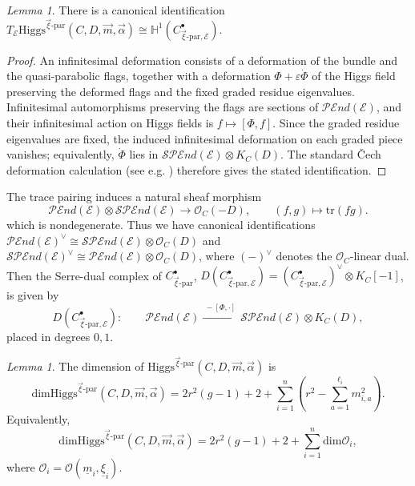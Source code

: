 \documentclass[11pt]{amsart}
\theoremstyle{plain}
\theoremstyle{definition}
\theoremstyle{remark}
\newtheorem{lemma}[theorem]{Lemma}
\newcommand{\End}{\mathcal E nd}
\newcommand{\HH}{\mathbb H}
\newcommand{\PEnd}{\mathcal P\!\End}
\newcommand{\SPEnd}{\mathcal{SP}\!\End}
\newcommand{\cO}{\mathcal O}
\newcommand{\Higgs}{\mathrm{Higgs}}
\def\dim{\mathrm{dim}}
\def\uxi{{\underline{\xi}}}
\def\vxi{\vec{\xi}}
\def\um{{\underline{m}}}
\begin{document}
\begin{lemma}\label{lem:tangent-hypercoh}
	There is a canonical identification
	$T_{\mathcal E}\Higgs^{\vec\xi\text{-par}}(C,D,\vec m,\vec\alpha)\cong \HH^1(C_{\vxi\text{-par},\mathcal E}^\bullet)$.
\end{lemma}

\begin{proof}
	An infinitesimal deformation consists of a deformation of the bundle and the quasi-parabolic flags, together with a deformation $\Phi+\varepsilon\dot\Phi$ of the Higgs field preserving the deformed flags and the fixed graded residue eigenvalues. Infinitesimal automorphisms preserving the flags are sections of $\PEnd(\mathcal E)$, and their infinitesimal action on Higgs fields is $f\mapsto[\Phi,f]$. Since the graded residue eigenvalues are fixed, the induced infinitesimal deformation on each graded piece vanishes; equivalently, $\dot\Phi$ lies in $\SPEnd(\mathcal E)\otimes K_C(D)$. The standard \v Cech deformation calculation (see e.g. \cite[Section 5]{Bottacin1995symplectic}) therefore gives the stated identification.
\end{proof}

The trace pairing induces a natural sheaf morphism
\[
\PEnd(\mathcal E)\otimes \SPEnd(\mathcal E)\to \mathcal O_C(-D),
\qquad
(f,g)\longmapsto \mathrm{tr}(fg).
\]
which is nondegenerate. Thus we have canonical identifications
$\PEnd(\mathcal E)^\vee \cong \SPEnd(\mathcal E)\otimes \mathcal O_C(D)$ and
$\SPEnd(\mathcal E)^\vee \cong \PEnd(\mathcal E)\otimes \mathcal O_C(D)$, where $(-)^\vee$ denotes the $\mathcal O_C$-linear dual. Then the Serre-dual complex of $C^\bullet_{\vxi\text{-par}}$, $D(C^\bullet_{\vxi\text{-par},\mathcal E})=(C^\bullet_{\vxi\text{-par},\mathcal E})^\vee \otimes K_C[-1]$, is given by 
\[
D(C^\bullet_{\vxi\text{-par},\mathcal E}):
\qquad
\PEnd(\mathcal E)
\xrightarrow{\ -[\Phi,\cdot]\ }
\SPEnd(\mathcal E)\otimes K_C(D),
\]
placed in degrees $0,1$. 
\begin{lemma}\label{lem:dim}
	The dimension of $\Higgs^{\vec\xi\text{-par}}(C,D,\vec m,\vec\alpha)$ is
	\[
	\dim \Higgs^{\vec\xi\text{-par}}(C,D,\vec m,\vec\alpha)
	=
	2r^2(g-1)+2+\sum_{i=1}^n\left(r^2-\sum_{a=1}^{\ell_i}m_{i,a}^2\right).
	\]
	Equivalently,
	\[
	\dim \Higgs^{\vec\xi\text{-par}}(C,D,\vec m,\vec\alpha)
	=
	2r^2(g-1)+2+\sum_{i=1}^n\dim\cO_i,
	\]
	where $\cO_i=\cO(\um_i,\uxi_i)$.
\end{lemma}
\end{document}

